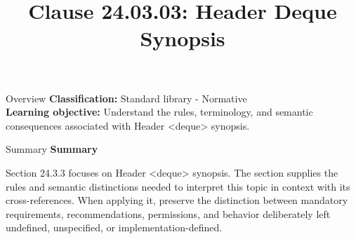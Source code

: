 \documentclass[10pt,letterpaper]{article}
\title{Clause 24.03.03: Header Deque Synopsis}
\author{}
\date{}
\begin{document}
\maketitle
\begin{CornellOverviewBox}{Overview}
\textbf{Classification:} Standard library - Normative\\[2pt]
\textbf{Learning objective:} Understand the rules, terminology, and semantic consequences associated with Header <deque> synopsis.
\end{CornellOverviewBox}\begin{CornellSummaryBox}{Summary}
{\sffamily\bfseries\color{Accent} Summary}\par\vspace{3pt}Section 24.3.3 focuses on Header <deque> synopsis. The section supplies the rules and semantic distinctions needed to interpret this topic in context with its cross-references. When applying it, preserve the distinction between mandatory requirements, recommendations, permissions, and behavior deliberately left undefined, unspecified, or implementation-defined.
\end{CornellSummaryBox}
\end{document}
